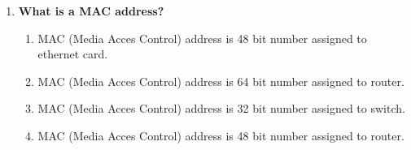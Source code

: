 \begin{flushleft}
\begin{enumerate}
		\item \textbf{What is a MAC address?}
		\begin{enumerate}[label=(\alph*)]
			\item MAC (Media Acces Control) address is 48 bit number assigned to ethernet card. %
			\item MAC (Media Acces Control) address is 64 bit number assigned to router.
			\item MAC (Media Acces Control) address is 32 bit number assigned to switch.
			\item MAC (Media Acces Control) address is 48 bit number assigned to router.
		\end{enumerate}
		\bigskip
		\bigskip		
		
		
		
	\end{enumerate}
	
	
\end{flushleft}

\newpage

